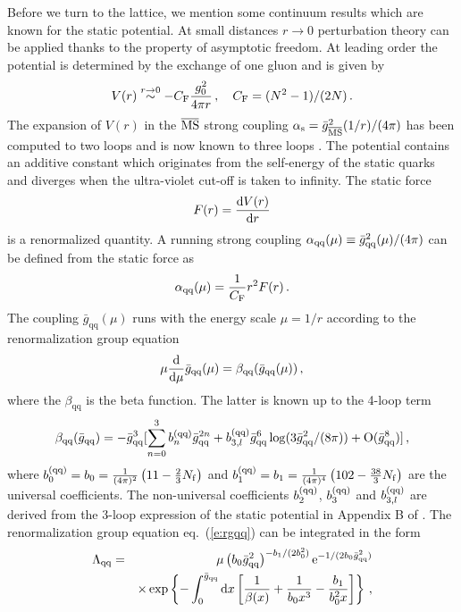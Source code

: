 \documentclass{PoS}
\newcommand{\eq}[1]{eq.~(\ref{#1})}
\newcommand{\gbar}{\bar{g}}
\newcommand{\msbar}{{\rm \overline{MS\kern-0.05em}\kern0.05em}}
\def\nf{N_{\mathrm{f}}}
\def\CF{C_{\rm F}}
\def\gqq{\bar{g}_\mathrm{qq}}
\def\aqq{\alpha_{\rm qq}}
\def\betaqq{\beta_\mathrm{qq}}
\def\bqq{b^{\rm(qq)}}
\def\as{\alpha_{\rm s}}
\begin{document}
Before we turn to the lattice, we mention some continuum results
which are known for the static potential.
At small distances $r\to0$ perturbation theory can be applied thanks to the
property of asymptotic freedom. At leading order the potential is determined
by the exchange of one gluon and is given by
\begin{equation}\label{e:onegluonexch}
V(r) \stackrel{r\to0}{\sim} -\CF\frac{g_0^2}{4\pi r}\,,\quad \CF=(N^2-1)/(2N) \,.
\end{equation}
The expansion of $V(r)$ in the $\msbar$ strong coupling 
$\as=\gbar^2_\msbar(1/r)/(4\pi)$ has been computed to two loops
\cite{Fischler:1977yf,Billoire:1979ih,Peter:1997me,Melles:2000dq}
and is now known to three loops
\cite{Brambilla:1999xf,Brambilla:1999qa,Smirnov:2009fh,Anzai:2009tm,Lee:2016cgz}
.
The potential contains an additive constant which originates from the
self-energy of the static quarks and diverges when the
ultra-violet cut-off is taken to infinity.
The static force
\begin{equation}
F(r) = \frac{{\rm d}V(r)}{{\rm d}r}
\end{equation}
is a renormalized quantity. A running strong coupling 
$\aqq(\mu) \equiv \gqq^2(\mu)/(4\pi)$
can be defined from the static force as
\begin{equation}
\aqq(\mu) = \frac{1}{\CF}r^2F(r) \,.
\end{equation}
The coupling $\gqq(\mu)$ runs with the energy scale $\mu=1/r$
according to the renormalization group equation
\begin{equation}\label{e:rgqq}
\mu \frac{{\rm d}}{{\rm d}\mu}\gqq(\mu) = \betaqq(\gqq(\mu)) \,,
\end{equation}
where the $\betaqq$ is the beta function.
The latter is known up to the 4-loop term
\begin{equation}\label{e:betaqq}
\betaqq(\gqq) =
-\gqq^3 [\sum_{n=0}^3 \bqq_n \gqq^{2n} +  \bqq_{3,l} \gqq^{6}\log(3 \gqq^2/(8\pi)) + \mathrm{O}({\gqq^8})] \,,
\end{equation}
where
$\bqq_0 = b_0=\frac{1}{(4\pi)^2}\left(11-\frac{2}{3}\nf\right)$ and
$\bqq_1 = b_1=\frac{1}{(4\pi)^4}\left(102-\frac{38}{3}\nf\right)$
are the universal coefficients. The non-universal coefficients 
$\bqq_2$, $\bqq_3$ and $\bqq_{3,l}$ are derived from the 3-loop
expression of the static potential in Appendix B of \cite{Donnellan:2010mx}.
The renormalization group equation \eq{e:rgqq} can be integrated in the form
\begin{eqnarray}
\Lambda_\mathrm{qq} &=&\mu\left(b_0\gqq^2\right)^{-b_1/(2b_0^2)} {\rm e}^{-1/(2b_0\gqq^2)} \nonumber \\
          && \times
           \exp \left\{-\int_0^{\gqq} {\rm d} x
          \left[\frac{1}{ \beta(x)}+\frac{1}{b_0x^3}-\frac{b_1}{b_0^2x}
          \right]
          \right\} \,, \label{e:Lambdaqq}
\end{eqnarray}
\end{document}
